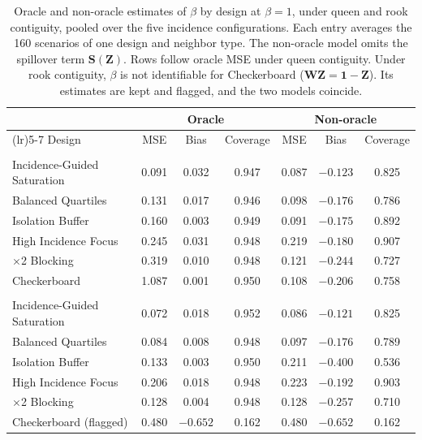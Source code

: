 \documentclass[11pt]{article}
\begin{document}
\begin{table}[!htb]

\small
\centering

\caption{Oracle and non-oracle estimates of $\beta$ by design at $\beta = 1$, under queen and rook contiguity, pooled over the five incidence configurations. Each entry averages the 160 scenarios of one design and neighbor type. The non-oracle model omits the spillover term $\mathbf{S}(\mathbf{Z})$. Rows follow oracle MSE under queen contiguity. Under rook contiguity, $\beta$ is not identifiable for Checkerboard ($\mathbf{W}\mathbf{Z} = \mathbf{1} - \mathbf{Z}$). Its estimates are kept and flagged, and the two models coincide.}
\label{tab:oracle-nonoracle}

\begin{tabular}{>{\raggedright\arraybackslash}p{4.0cm}cccccc}

\toprule
& \multicolumn{3}{c}{Oracle} & \multicolumn{3}{c}{Non-oracle} \\
\cmidrule(lr){2-4}\cmidrule(lr){5-7}
Design & MSE & Bias & Coverage & MSE & Bias & Coverage \\

\midrule
\multicolumn{7}{l}{\textit{Queen contiguity (primary)}} \\
Incidence-Guided Saturation & 0.091 & 0.032 & 0.947 & 0.087 & $-0.123$ & 0.825 \\
Balanced Quartiles & 0.131 & 0.017 & 0.946 & 0.098 & $-0.176$ & 0.786 \\
Isolation Buffer & 0.160 & 0.003 & 0.949 & 0.091 & $-0.175$ & 0.892 \\
High Incidence Focus & 0.245 & 0.031 & 0.948 & 0.219 & $-0.180$ & 0.907 \\
2$\times$2 Blocking & 0.319 & 0.010 & 0.948 & 0.121 & $-0.244$ & 0.727 \\
Checkerboard & 1.087 & 0.001 & 0.950 & 0.108 & $-0.206$ & 0.758 \\

\midrule
\multicolumn{7}{l}{\textit{Rook contiguity (sensitivity)}} \\
Incidence-Guided Saturation & 0.072 & 0.018 & 0.952 & 0.086 & $-0.121$ & 0.825 \\
Balanced Quartiles & 0.084 & 0.008 & 0.948 & 0.097 & $-0.176$ & 0.789 \\
Isolation Buffer & 0.133 & 0.003 & 0.950 & 0.211 & $-0.400$ & 0.536 \\
High Incidence Focus & 0.206 & 0.018 & 0.948 & 0.223 & $-0.192$ & 0.903 \\
2$\times$2 Blocking & 0.128 & 0.004 & 0.948 & 0.128 & $-0.257$ & 0.710 \\
Checkerboard (flagged) & 0.480 & $-0.652$ & 0.162 & 0.480 & $-0.652$ & 0.162 \\

\bottomrule

\end{tabular}

\end{table}
\end{document}
